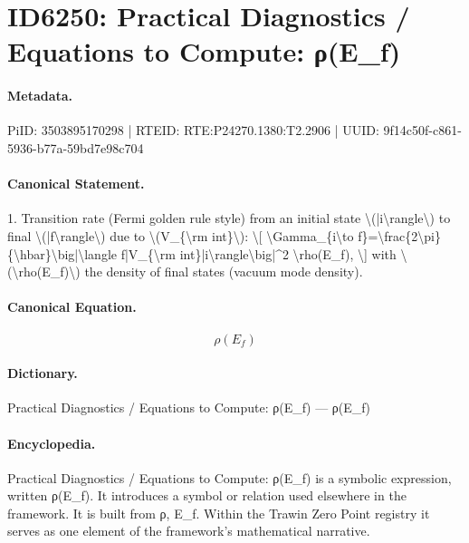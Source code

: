 \section*{ID6250: Practical Diagnostics / Equations to Compute: ρ(E\_f)}
\paragraph{Metadata.}
PiID: 3503895170298 | RTEID: RTE:P24270.1380:T2.2906 | UUID: 9f14c50f-c861-5936-b77a-59bd7e98c704

\paragraph{Canonical Statement.}
1. Transition rate (Fermi golden rule style) from an initial state \textbackslash{}(|i\textbackslash{}rangle\textbackslash{}) to final \textbackslash{}(|f\textbackslash{}rangle\textbackslash{}) due to \textbackslash{}(V\_\{\textbackslash{}rm int\}\textbackslash{}): \textbackslash{}[ \textbackslash{}Gamma\_\{i\textbackslash{}to f\}=\textbackslash{}frac\{2\textbackslash{}pi\}\{\textbackslash{}hbar\}\textbackslash{}big|\textbackslash{}langle f|V\_\{\textbackslash{}rm int\}|i\textbackslash{}rangle\textbackslash{}big|\textasciicircum{}2 \textbackslash{}rho(E\_f), \textbackslash{}] with \textbackslash{}(\textbackslash{}rho(E\_f)\textbackslash{}) the density of final states (vacuum mode density).

\paragraph{Canonical Equation.}
\[
\rho(E_f)
\]

\paragraph{Dictionary.}
Practical Diagnostics / Equations to Compute: ρ(E\_f) — ρ(E\_f)

\paragraph{Encyclopedia.}
Practical Diagnostics / Equations to Compute: ρ(E\_f) is a symbolic expression, written ρ(E\_f). It introduces a symbol or relation used elsewhere in the framework. It is built from ρ, E\_f. Within the Trawin Zero Point registry it serves as one element of the framework's mathematical narrative.
